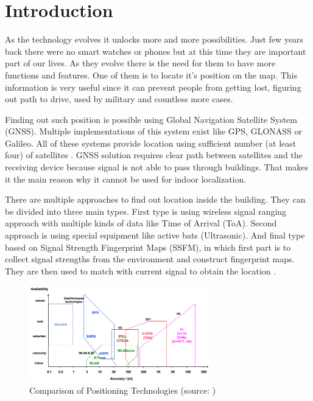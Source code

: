 \chapter{Introduction}\label{sec:Introduction}
\setcounter{page}{1}
As the technology evolves it unlocks more and more possibilities. Just few years back there were no smart watches or phones but at this time they are important part of our lives. As they evolve there is the need for them to have more functions and features. One of them is to locate it's position on the map. This information is very useful since it can prevent people from getting lost, figuring out path to drive, used by military and countless more cases.

Finding out such position is possible using Global Navigation Satellite System (GNSS). Multiple implementations of this system exist like GPS, GLONASS or Galileo. All of these systems provide location using sufficient number (at least four) of satellites \cite{GNSS}\cite{GNSSGPS}. GNSS solution requires clear path between satellites and the receiving device because signal is not able to pass through buildings. That makes it the main reason why it cannot be used for indoor localization.

There are multiple approaches to find out location inside the building. They can be divided into three main types. First type is using wireless signal ranging approach with multiple kinds of data like Time of Arrival (ToA). Second approach is using special equipment like active bats (Ultrasonic). And final type based on Signal Strength Fingerprint Maps (SSFM), in which first part is to collect signal strengths from the environment and construct fingerprint maps. They are then used to match with current signal to obtain the location \cite{LocalizationApproaches}.

\begin{figure}[h!]
	\begin{centering}
		\includegraphics[width=0.7\textwidth]{img/1_comparison_of_positionin_technologies}
		\par\end{centering}
	\caption{Comparison of Positioning Technologies (source: \cite{PedestrianDeadReckoning})\label{fig:1_comparison_of_positionin_technologies}}
\end{figure}

